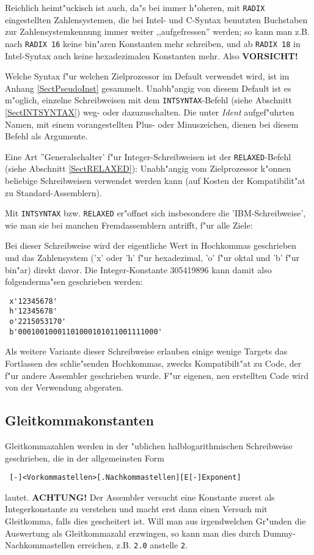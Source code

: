 \documentclass[12pt,a4paper,twoside]{report}
\newcommand{\ii}[1]{{\it #1}}
\newcommand{\bb}[1]{{\bf #1}}
\newcommand{\tty}[1]{{\tt #1}}
\begin{document}
Reichlich heimt"uckisch ist auch, da"s bei immer h"oheren, mit {\tt RADIX}
eingestellten Zahlensystemen, die bei Intel- und C-Syntax benutzten
Buchstaben zur Zahlensystemkennung immer weiter ,,aufgefressen'' werden; so
kann man z.B. nach {\tt RADIX 16} keine bin"aren Konstanten mehr
schreiben, und ab {\tt RADIX 18} in Intel-Syntax auch keine hexadezimalen
Konstanten mehr.  Also {\bf VORSICHT!}

Welche Syntax f"ur welchen Zielprozessor im Default verwendet wird, ist
im Anhang \ref{SectPseudoInst} gesammelt.  Unabh"angig von diesem Default
ist es m"oglich, einzelne Schreibweisen mit dem \tty{INTSYNTAX}-Befehl
(siehe Abschnitt \ref{SectINTSYNTAX}) weg- oder dazuzuschalten.  Die unter
\ii{Ident} aufgef"uhrten Namen, mit einem vorangestellten Plus- oder
Minuszeichen, dienen bei diesem Befehl als Argumente.

Eine Art ''Generalschalter' f"ur Integer-Schreibweisen ist der
\tty{RELAXED}-Befehl (siehe Abschnitt \ref{SectRELAXED}): Unabh"angig
vom Zielprozessor k"onnen beliebige Schreibweisen verwendet werden
kann (auf Kosten der Kompatibilit"at zu Standard-Assemblern).

Mit \tty{INTSYNTAX} bzw. \tty{RELAXED} er"offnet sich insbesondere die
'IBM-Schreibweise', wie man sie bei manchen Fremdassemblern antrifft,
f"ur alle Ziele:

Bei dieser Schreibweise wird der eigentliche Wert in Hochkommas geschrieben
und das Zahlensystem ('x' oder 'h' f"ur hexadezimal, 'o' f"ur oktal und 'b'
f"ur bin"ar) direkt davor.  Die Integer-Konstante 305419896 kann damit
also folgenderma"sen geschrieben werden:
\begin{verbatim}
 x'12345678'
 h'12345678'
 o'2215053170'
 b'00010010001101000101011001111000'
\end{verbatim}
Als weitere Variante dieser Schreibweise erlauben einige wenige Targets
das Fortlassen des schlie"senden Hochkommas, zwecks Kompatibilt"at zu
Code, der f"ur andere Assembler geschrieben wurde.  F"ur eigenen, neu
erstellten Code wird von der Verwendung abgeraten.

\subsection{Gleitkommakonstanten}

Gleitkommazahlen werden in der "ublichen halblogarithmischen
Schreibweise geschrieben, die in der allgemeinsten Form
\begin{verbatim}
 [-]<Vorkommastellen>[.Nachkommastellen][E[-]Exponent]
\end{verbatim}
lautet. \bb{ACHTUNG!} Der Assembler versucht eine Konstante zuerst als
Integerkonstante zu verstehen und macht erst dann einen Versuch mit
Gleitkomma, falls dies gescheitert ist.  Will man aus irgendwelchen
Gr"unden die Auswertung als Gleitkommazahl erzwingen, so kann man
dies durch Dummy-Nachkommastellen erreichen, z.B. \tty{2.0} anstelle
\tty{2}.
\end{document}
